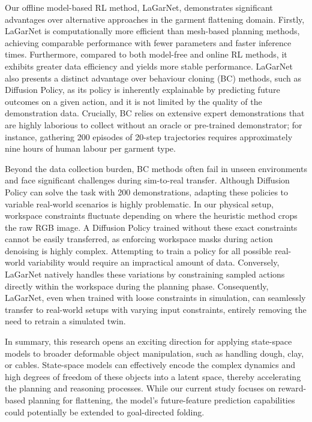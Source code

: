 \documentclass[journal]{IEEEtran}
\begin{document}
Our offline model-based RL method, LaGarNet, demonstrates significant advantages over alternative approaches in the garment flattening domain. Firstly, LaGarNet is computationally more efficient than mesh-based planning methods, achieving comparable performance with fewer parameters and faster inference times. Furthermore, compared to both model-free and online RL methods, it exhibits greater data efficiency and yields more stable performance. LaGarNet also presents a distinct advantage over behaviour cloning (BC) methods, such as Diffusion Policy, as its policy is inherently explainable by predicting future outcomes on a given action, and it is not limited by the quality of the demonstration data. Crucially, BC relies on extensive expert demonstrations that are highly laborious to collect without an oracle or pre-trained demonstrator; for instance, gathering 200 episodes of 20-step trajectories requires approximately nine hours of human labour per garment type.

Beyond the data collection burden, BC methods often fail in unseen environments and face significant challenges during sim-to-real transfer. Although Diffusion Policy can solve the task with 200 demonstrations, adapting these policies to variable real-world scenarios is highly problematic. In our physical setup, workspace constraints fluctuate depending on where the heuristic method crops the raw RGB image. A Diffusion Policy trained without these exact constraints cannot be easily transferred, as enforcing workspace masks during action denoising is highly complex. Attempting to train a policy for all possible real-world variability would require an impractical amount of data. Conversely, LaGarNet natively handles these variations by constraining sampled actions directly within the workspace during the planning phase. Consequently, LaGarNet, even when trained with loose constraints in simulation, can seamlessly transfer to real-world setups with varying input constraints, entirely removing the need to retrain a simulated twin.

In summary, this research opens an exciting direction for applying state-space models to broader deformable object manipulation, such as handling dough, clay, or cables. State-space models can effectively encode the complex dynamics and high degrees of freedom of these objects into a latent space, thereby accelerating the planning and reasoning processes. While our current study focuses on reward-based planning for flattening, the model's future-feature prediction capabilities could potentially be extended to goal-directed folding. 
\end{document}
